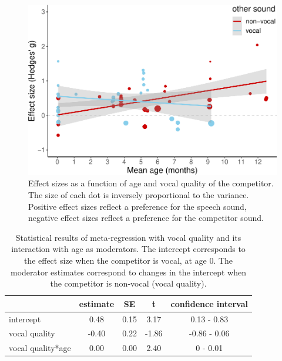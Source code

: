 \documentclass[
  man,mask,floatsintext]{apa6}
\begin{document}
\begin{figure}
\centering
\includegraphics{MA_speech_pref_files/figure-latex/vocal-1.pdf}
\caption{\label{fig:vocal}Effect sizes as a function of age and vocal quality of the competitor. The size of each dot is inversely proportional to the variance. Positive effect sizes reflect a preference for the speech sound, negative effect sizes reflect a preference for the competitor sound.}
\end{figure}

\begin{table}[tbp]

\begin{center}
\begin{threeparttable}

\caption{\label{tab:TableVocal}Statistical results of meta-regression with vocal quality and its interaction with age as moderators. The intercept corresponds to the effect size when the competitor is vocal, at age 0. The moderator estimates correspond to changes in the intercept when the competitor is non-vocal (vocal quality).}

\begin{tabular}{lcccc}
\toprule
 & estimate & SE & t & confidence interval\\
\midrule
intercept & 0.48 & 0.15 & 3.17 & 0.13 - 0.83\\
vocal quality & -0.40 & 0.22 & -1.86 & -0.86 - 0.06\\
vocal quality*age & 0.00 & 0.00 & 2.40 & 0 - 0.01\\
\bottomrule
\end{tabular}

\end{threeparttable}
\end{center}

\end{table}
\end{document}
